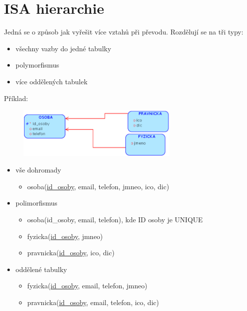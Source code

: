 \documentclass{szzclass}
\begin{document}
\section{ISA hierarchie}
Jedná se o způsob jak vyřešit více vztahů při převodu.
Rozdělují se na tři typy:
\begin{itemize}
    \item všechny vazby do jedné tabulky
    \item polymorfismus
    \item více oddělených tabulek
\end{itemize}
Příklad:
\begin{figure}[h!]
    \centering
    \includegraphics[width=0.7\textwidth]{topics/bi-wsi-si-02/images/isa.png}
\end{figure}
\begin{itemize}
    \item vše dohromady
    \begin{itemize}
        \item osoba(\underline{id\_osoby}, email, telefon, jmneo, ico, dic)
    \end{itemize}
    \item polimorfismus
    \begin{itemize}
        \item osoba(id\_osoby, email, telefon), kde ID osoby je UNIQUE
        \item fyzicka(\underline{id\_osoby}, jmneo)
        \item pravnicka(\underline{id\_osoby}, ico, dic)
    \end{itemize}
    \item oddělené tabulky
    \begin{itemize}
        \item fyzicka(\underline{id\_osoby}, email, telefon, jmneo)
        \item pravnicka(\underline{id\_osoby}, email, telefon, ico, dic)
    \end{itemize}
\end{itemize}
\end{document}
